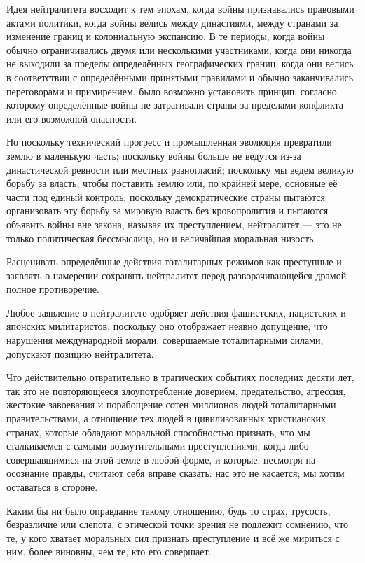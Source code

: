 Идея нейтралитета восходит к тем эпохам, когда войны признавались правовыми актами политики, когда войны велись между династиями, между странами за изменение границ и колониальную экспансию. В те периоды, когда войны обычно ограничивались двумя или несколькими участниками, когда они никогда не выходили за пределы определённых географических границ, когда они велись в соответствии с определёнными принятыми правилами и обычно заканчивались переговорами и примирением, было возможно установить принцип, согласно которому определённые войны не затрагивали страны за пределами конфликта или его возможной опасности.

Но поскольку технический прогресс и промышленная эволюция превратили землю в маленькую часть; поскольку войны больше не ведутся из-за династической ревности или местных разногласий; поскольку мы ведем великую борьбу за власть, чтобы поставить землю или, по крайней мере, основные её части под единый контроль; поскольку демократические страны пытаются организовать эту борьбу за мировую власть без кровопролития и пытаются объявить войны вне закона, называя их преступлением, нейтралитет — это не только политическая бессмыслица, но и величайшая моральная низость.

Расценивать определённые действия тоталитарных режимов как преступные и заявлять о намерении сохранять нейтралитет перед разворачивающейся драмой — полное противоречие.

Любое заявление о нейтралитете одобряет действия фашистских, нацистских и японских милитаристов, поскольку оно отображает неявно допущение, что нарушения международной морали, совершаемые тоталитарными силами, допускают позицию нейтралитета.

Что действительно отвратительно в трагических событиях последних десяти лет, так это не повторяющееся злоупотребление доверием, предательство, агрессия, жестокие завоевания и порабощение сотен миллионов людей тоталитарными правительствами, а отношение тех людей в цивилизованных христианских странах, которые обладают моральной способностью признать, что мы сталкиваемся с самыми возмутительными преступлениями, когда-либо совершавшимися на этой земле в любой форме, и которые, несмотря на осознание правды, считают себя вправе сказать: нас это не касается; мы хотим оставаться в стороне.

Каким бы ни было оправдание такому отношению, будь то страх, трусость, безразличие или слепота, с этической точки зрения не подлежит сомнению, что те, у кого хватает моральных сил признать преступление и всё же мириться с ним, более виновны, чем те, кто его совершает.

